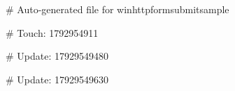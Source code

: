 # Auto-generated file for winhttpformsubmitsample

# Touch: 1792954911

# Update: 17929549480

# Update: 17929549630
